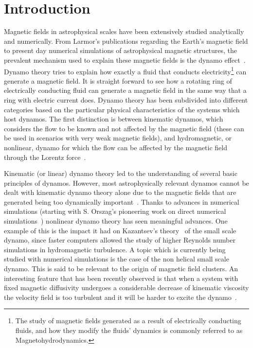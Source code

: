 \documentclass[12pt,a4paper]{report}
\begin{document}

\chapter{Introduction}

Magnetic fields in astrophysical scales have been extensively studied analytically and numerically. From Larmor's publications regarding the Earth's magnetic field to present day numerical simulations of astrophysical magnetic structures, the prevalent mechanism used to explain these magnetic fields is the dynamo effect~\cite{sir1919larmor}. Dynamo theory tries to explain how exactly a fluid that conducts electricity\footnote{The study of magnetic fields generated as a result of electrically conducting fluids, and how they modify the fluids' dynamics is commonly referred to as Magnetohydrodynamics.} can generate a magnetic field. It is straight forward to see how a rotating ring of electrically conducting fluid can generate a magnetic field in the same way that a ring with electric current does. Dynamo theory has been subdivided into different categories based on the particular physical characteristics of the systems which host dynamos. The first distinction is between kinematic dynamos, which considers the flow to be known and not affected by the magnetic field (these can be used in scenarios with very weak magnetic fields), and hydromagnetic, or nonlinear, dynamo for which the flow can be affected by the magnetic field through the Lorentz force~\cite{brandenburg2007hydromagnetic}.

Kinematic (or linear) dynamo theory led to the understanding of several basic principles of dynamos. However, most astrophysically relevant dynamos cannot be dealt with kinematic dynamo theory alone due to the magnetic fields that are generated being too dynamically important~\cite{brandenburg2005astrophysical}. Thanks to advances in numerical simulations (starting with S. Orszag's pioneering work on direct numerical simulations~\cite{orszag1970analytical}) nonlinear dynamo theory has seen meaningful advances. One example of this is the impact it had on Kazantsev's theory~\cite{kazantsev1968enhancement} of the small scale dynamo, since faster computers allowed the study of higher Reynolds number simulations in hydromagnetic turbulence. A topic which is currently being studied with numerical simulations is the case of the non helical small scale dynamo. This is said to be relevant to the origin of magnetic field clusters. An interesting feature that has been recently observed is that when a system with fixed magnetic diffusivity undergoes a considerable decrease of kinematic viscosity the velocity field is too turbulent and it will be harder to excite the dynamo~\cite{schekochihin2004critical}. 
\end{document}
